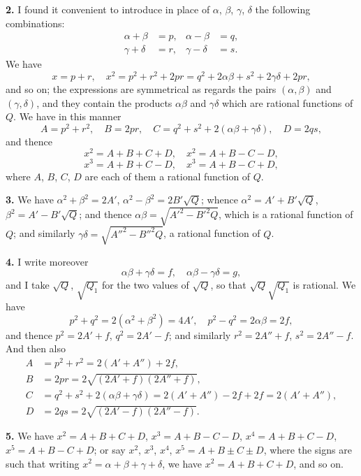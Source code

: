 \documentclass[11pt,a4paper]{article}
\begin{document}
\vspace{0.5em}
\textbf{2.} I found it convenient to introduce in place of $\alpha$, $\beta$, $\gamma$, $\delta$ the following combinations:
\begin{align*}
\alpha + \beta &= p, & \alpha - \beta &= q, \\
\gamma + \delta &= r, & \gamma - \delta &= s.
\end{align*}
We have
\[
x = p + r, \quad x^2 = p^2 + r^2 + 2pr = q^2 + 2\alpha\beta + s^2 + 2\gamma\delta + 2pr,
\]
and so on; the expressions are symmetrical as regards the pairs $(\alpha, \beta)$ and $(\gamma, \delta)$, and they contain the products $\alpha\beta$ and $\gamma\delta$ which are rational functions of $Q$. We have in this manner
\[
A = p^2 + r^2, \quad B = 2pr, \quad C = q^2 + s^2 + 2(\alpha\beta + \gamma\delta), \quad D = 2qs,
\]
and thence
\[
x^2 = A + B + C + D, \quad x^2 = A + B - C - D,
\]
\[
x^3 = A + B + C - D, \quad x^3 = A + B - C + D,
\]
where $A$, $B$, $C$, $D$ are each of them a rational function of $Q$.

\vspace{0.5em}
\textbf{3.} We have $\alpha^2 + \beta^2 = 2A'$, $\alpha^2 - \beta^2 = 2B'\sqrt{Q}$; whence $\alpha^2 = A' + B'\sqrt{Q}$, $\beta^2 = A' - B'\sqrt{Q}$; and thence $\alpha\beta = \sqrt{A'^2 - B'^2Q}$, which is a rational function of $Q$; and similarly $\gamma\delta = \sqrt{A''^2 - B''^2Q}$, a rational function of $Q$.

\vspace{0.5em}
\textbf{4.} I write moreover
\[
\alpha\beta + \gamma\delta = f, \quad \alpha\beta - \gamma\delta = g,
\]
and I take $\sqrt{Q}$, $\sqrt{Q_1}$ for the two values of $\sqrt{Q}$, so that $\sqrt{Q}\sqrt{Q_1}$ is rational. We have
\[
p^2 + q^2 = 2(\alpha^2 + \beta^2) = 4A', \quad p^2 - q^2 = 2\alpha\beta = 2f,
\]
and thence $p^2 = 2A' + f$, $q^2 = 2A' - f$; and similarly $r^2 = 2A'' + f$, $s^2 = 2A'' - f$. And then also
\begin{align*}
A &= p^2 + r^2 = 2(A' + A'') + 2f, \\
B &= 2pr = 2\sqrt{(2A' + f)(2A'' + f)}, \\
C &= q^2 + s^2 + 2(\alpha\beta + \gamma\delta) = 2(A' + A'') - 2f + 2f = 2(A' + A''), \\
D &= 2qs = 2\sqrt{(2A' - f)(2A'' - f)}.
\end{align*}

\vspace{0.5em}
\textbf{5.} We have $x^2 = A + B + C + D$, $x^3 = A + B - C - D$, $x^4 = A + B + C - D$, $x^5 = A + B - C + D$; or say $x^2$, $x^3$, $x^4$, $x^5 = A + B \pm C \pm D$, where the signs are such that writing $x^2 = \alpha + \beta + \gamma + \delta$, we have $x^2 = A + B + C + D$, and so on.
\end{document}

